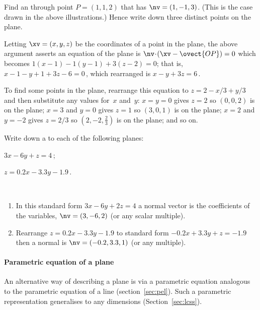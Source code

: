 \begin{example} \label{eg:}
Find an  through point \(P=(1,1,2)\) that has  \(\nv=(1,-1,3)\).
(This is the case drawn in the above illustrations.)
Hence write down three distinct points on the plane.
\begin{solution} 
Letting \(\xv=(x,y,z)\) be the coordinates of a point in the plane, the above argument asserts an equation of the plane is \(\nv\cdot(\xv-\ovect{OP})=0\) which becomes
\(1(x-1)-1(y-1)+3(z-2)=0\); that is, \(x-1-y+1+3z-6=0\)\,, which rearranged is \(x-y+3z=6\)\,. 

To find some points in the plane, rearrange this equation to \(z=2-x/3+y/3\) and then substitute any values for~\(x\) and~\(y\):  
\(x=y=0\) gives \(z=2\) so \((0,0,2)\) is on the plane; 
\(x=3\) and \(y=0\) gives \(z=1\) so \((3,0,1)\) is on the plane;
\(x=2\) and \(y=-2\) gives \(z=2/3\) so \((2,-2,\frac23)\) is on the plane; and so on.
\end{solution}
\end{example}





\begin{example} \label{eg:}
Write down a  to each of the following planes:
\begin{parts}
\item \(3x-6y+z=4\)\,;
\item \(z=0.2x-3.3y-1.9\)\,.
\end{parts}
\begin{solution} \ 
\begin{enumerate}
\item In this standard form \(3x-6y+2z=4\) a normal vector is the coefficients of the variables, \(\nv=(3,-6,2)\) (or any scalar multiple).
\item Rearrange \(z=0.2x-3.3y-1.9\) to standard form \(-0.2x+3.3y+z=-1.9\) then a normal is \(\nv=(-0.2,3.3,1)\) (or any multiple).
\end{enumerate} 
\end{solution}
\end{example}





\paragraph{Parametric equation of a plane}
An alternative way of describing a plane is via a parametric equation analogous to the parametric equation of a line (section~\ref{sec:pel}).
Such a parametric representation generalises to any dimensions (Section~\ref{sec:lcss}).

